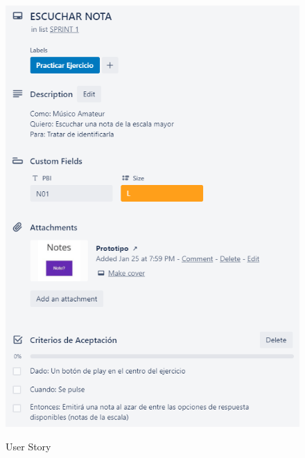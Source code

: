 \documentclass[12pt,twoside,titlepage]{report}
\begin{document}
{\begin{figure}[H]
    \centering
    \includegraphics[scale=1.3]{Scrum/User Stories/Notas}
    \label{fig:Notas}
    \caption{User Story}
\end{figure}

}
\end{document}

